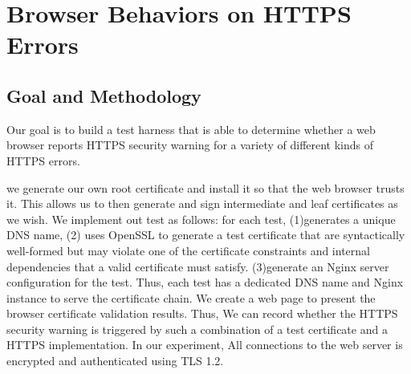 \section{Browser Behaviors on HTTPS Errors}
\subsection{Goal and Methodology}
Our goal is to build a test harness that is able to determine whether a web browser reports HTTPS security warning for a variety of different kinds of HTTPS errors.

we generate our own root certificate and install it so that the web browser trusts it.
    This allows us to then generate and sign intermediate and leaf certificates as we wish.
We implement out test as follows: for each test,
    (1)generates a unique DNS name,
    (2) uses OpenSSL to generate a test certificate that are syntactically well-formed but may violate one of the certificate constraints and internal dependencies that a valid certificate must satisfy.
    (3)generate an Nginx server configuration for the test.
Thus, each test has a dedicated DNS name and Nginx instance to serve the certificate chain.
    We create a web page to present the browser certificate validation results.
    Thus, We can record whether the HTTPS security warning is triggered by such a combination of a test certificate and a HTTPS implementation.
    In our experiment, All connections to the web server is encrypted and authenticated using TLS 1.2.

